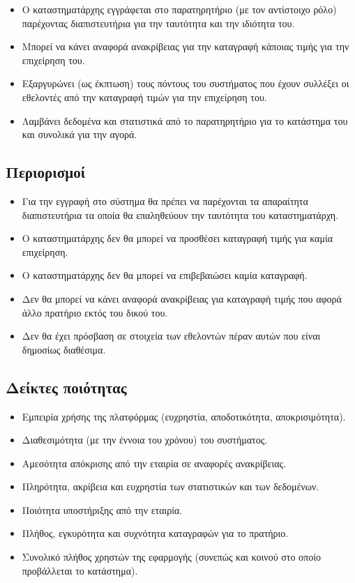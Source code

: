\documentclass[a4paper,oneside, 12pt]{article}
\begin{document}
\begin{itemize}
	
\item Ο καταστηματάρχης εγγράφεται στο παρατηρητήριο (με τον αντίστοιχο ρόλο)
παρέχοντας διαπιστευτήρια για την ταυτότητα και την ιδιότητα του.
\item Μπορεί να κάνει αναφορά ανακρίβειας για την καταγραφή κάποιας τιμής για την
επιχείρηση του.
\item Εξαργυρώνει (ως έκπτωση) τους πόντους του συστήματος που έχουν συλλέξει οι
εθελοντές από την καταγραφή τιμών για την επιχείρηση του.
\item Λαμβάνει δεδομένα και στατιστικά από το παρατηρητήριο για το κατάστημα του
και συνολικά για την αγορά.

\end{itemize}

\subsection{Περιορισμοί}

\begin{itemize}
	\item Για την εγγραφή στο σύστημα θα πρέπει να παρέχονται τα απαραίτητα
	διαπιστευτήρια τα οποία θα επαληθεύουν την ταυτότητα του καταστηματάρχη.
	\item  Ο καταστηματάρχης δεν θα μπορεί να προσθέσει καταγραφή τιμής για καμία
	επιχείρηση.
	\item  Ο καταστηματάρχης δεν θα μπορεί να επιβεβαιώσει καμία καταγραφή.
	\item  Δεν θα μπορεί να κάνει αναφορά ανακρίβειας για καταγραφή τιμής που αφορά
	άλλο πρατήριο εκτός του δικού του.
	\item  Δεν θα έχει πρόσβαση σε στοιχεία των εθελοντών πέραν αυτών που είναι
	δημοσίως διαθέσιμα.
\end{itemize}

\subsection{Δείκτες ποιότητας}


\begin{itemize}
	
	\item Εμπειρία χρήσης της πλατφόρμας (ευχρηστία, αποδοτικότητα, αποκρισιμότητα).
	\item Διαθεσιμότητα (με την έννοια του χρόνου) του συστήματος.
	\item Αμεσότητα απόκρισης από την εταιρία σε αναφορές ανακρίβειας.
	\item Πληρότητα, ακρίβεια και ευχρηστία των στατιστικών και των δεδομένων.
	\item Ποιότητα υποστήριξης από την εταιρία.
	\item Πλήθος, εγκυρότητα και συχνότητα καταγραφών για το πρατήριο.
	\item Συνολικό πλήθος χρηστών της εφαρμογής (συνεπώς και κοινού στο οποίο
	προβάλλεται το κατάστημα).
	
\end{itemize}
\end{document}
